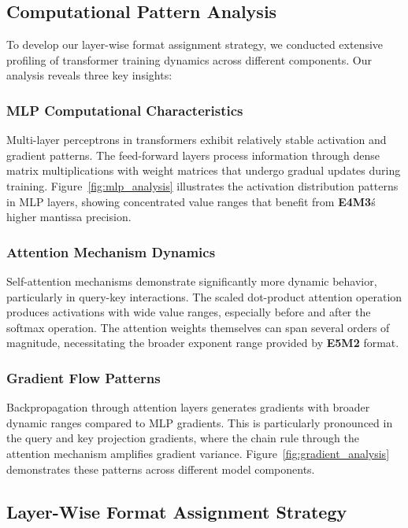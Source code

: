 \documentclass[conference]{IEEEtran}
\begin{document}
\subsection{Computational Pattern Analysis}

To develop our layer-wise format assignment strategy, we conducted extensive profiling of transformer training dynamics across different components. Our analysis reveals three key insights:

\subsubsection{MLP Computational Characteristics}
Multi-layer perceptrons in transformers exhibit relatively stable activation and gradient patterns. The feed-forward layers process information through dense matrix multiplications with weight matrices that undergo gradual updates during training. Figure~\ref{fig:mlp_analysis} illustrates the activation distribution patterns in MLP layers, showing concentrated value ranges that benefit from \textbf{E4M3}\'s higher mantissa precision.

\subsubsection{Attention Mechanism Dynamics}
Self-attention mechanisms demonstrate significantly more dynamic behavior, particularly in query-key interactions. The scaled dot-product attention operation produces activations with wide value ranges, especially before and after the softmax operation. The attention weights themselves can span several orders of magnitude, necessitating the broader exponent range provided by \textbf{E5M2} format.

\subsubsection{Gradient Flow Patterns}
Backpropagation through attention layers generates gradients with broader dynamic ranges compared to MLP gradients. This is particularly pronounced in the query and key projection gradients, where the chain rule through the attention mechanism amplifies gradient variance. Figure~\ref{fig:gradient_analysis} demonstrates these patterns across different model components.

\subsection{Layer-Wise Format Assignment Strategy}
\end{document}
